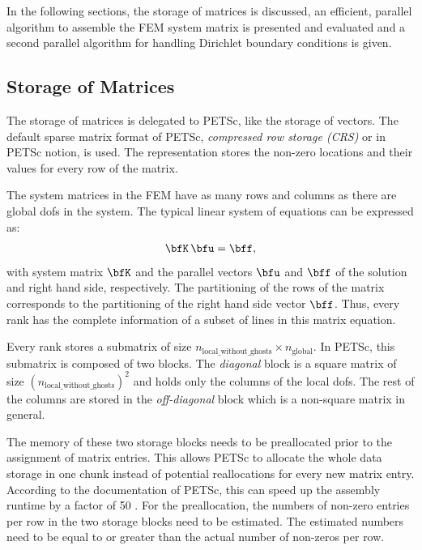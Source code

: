 In the following sections, the storage of matrices is discussed, an efficient, parallel algorithm to assemble the FEM system matrix is presented and evaluated and a second parallel algorithm for handling Dirichlet boundary conditions is given.

\subsection{Storage of Matrices}
The storage of matrices is delegated to PETSc, like the storage of vectors. The default sparse  matrix format of PETSc, \emph{compressed row storage (CRS)} or  in PETSc notion, is used. 
The representation stores the non-zero locations and their values for every row of the matrix.

The system matrices in the FEM have as many rows and columns as there are global dofs in the system. The typical linear system of equations can be expressed as:
\begin{align*}
  \bfK\,\bfu = \bff,
\end{align*}
with system matrix $\bfK$ and the parallel vectors $\bfu$ and $\bff$ of the solution and right hand side, respectively. The partitioning of the rows of the matrix corresponds to the partitioning of the right hand side vector $\bff$. Thus, every rank has the complete information of a subset of lines in this matrix equation.

Every rank stores a submatrix of size $n_\text{local\_without\_ghosts} \times n_\text{global}$. In PETSc, this submatrix is composed of two blocks. The \emph{diagonal} block is a square matrix of size $(n_\text{local\_without\_ghosts})^2$ and holds only the columns of the local dofs. The rest of the columns are stored in the \emph{off-diagonal} block which is a non-square matrix in general.

The memory of these two storage blocks needs to be preallocated prior to the assignment of matrix entries. This allows PETSc to allocate the whole data storage in one chunk instead of potential reallocations for every new matrix entry. According to the documentation of PETSc, this can speed up the assembly runtime by a factor of 50 \cite{petsc-web-page}. For the preallocation, the numbers of non-zero entries per row in the two storage blocks need to be estimated. The estimated numbers need to be equal to or greater than the actual number of non-zeros per row.


